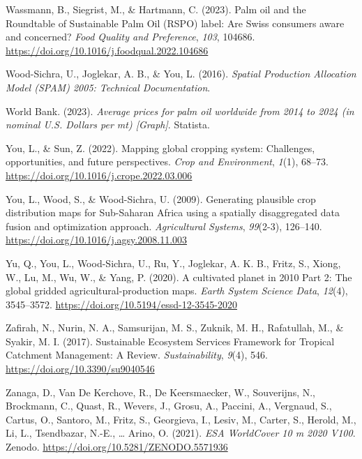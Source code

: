 \documentclass[
  letterpaper,
  DIV=11,
  numbers=noendperiod]{scrreprt}
\newlength{\cslhangindent}
\newlength{\cslentryspacingunit} %
\newenvironment{CSLReferences}[2] %
 {%
  \setlength{\parindent}{0pt}
  \ifodd #1
  \let\oldpar\par
  \def\par{\hangindent=\cslhangindent\oldpar}
  \fi
  \setlength{\parskip}{#2\cslentryspacingunit}
 }%
 {}
\begin{document}
\begin{CSLReferences}{1}{0}
\leavevmode{}%
Wassmann, B., Siegrist, M., \& Hartmann, C. (2023). Palm oil and the
{Roundtable} of {Sustainable Palm Oil} ({RSPO}) label: {Are Swiss}
consumers aware and concerned? \emph{Food Quality and Preference},
\emph{103}, 104686. \url{https://doi.org/10.1016/j.foodqual.2022.104686}

\leavevmode{}%
Wood-Sichra, U., Joglekar, A. B., \& You, L. (2016). \emph{Spatial
{Production Allocation Model} ({SPAM}) 2005: {Technical Documentation}}.

\leavevmode{}%
World Bank. (2023). \emph{Average prices for palm oil worldwide from
2014 to 2024 (in nominal {U}.{S}. Dollars per mt) {[}{Graph}{]}}.
{Statista}.

\leavevmode{}%
You, L., \& Sun, Z. (2022). Mapping global cropping system:
{Challenges}, opportunities, and future perspectives. \emph{Crop and
Environment}, \emph{1}(1), 68--73.
\url{https://doi.org/10.1016/j.crope.2022.03.006}

\leavevmode{}%
You, L., Wood, S., \& Wood-Sichra, U. (2009). Generating plausible crop
distribution maps for {Sub-Saharan Africa} using a spatially
disaggregated data fusion and optimization approach. \emph{Agricultural
Systems}, \emph{99}(2-3), 126--140.
\url{https://doi.org/10.1016/j.agsy.2008.11.003}

\leavevmode{}%
Yu, Q., You, L., Wood-Sichra, U., Ru, Y., Joglekar, A. K. B., Fritz, S.,
Xiong, W., Lu, M., Wu, W., \& Yang, P. (2020). A cultivated planet in
2010 \textendash{} {Part} 2: {The} global gridded
agricultural-production maps. \emph{Earth System Science Data},
\emph{12}(4), 3545--3572.
\url{https://doi.org/10.5194/essd-12-3545-2020}

\leavevmode{}%
Zafirah, N., Nurin, N. A., Samsurijan, M. S., Zuknik, M. H., Rafatullah,
M., \& Syakir, M. I. (2017). Sustainable {Ecosystem Services Framework}
for {Tropical Catchment Management}: {A Review}. \emph{Sustainability},
\emph{9}(4), 546. \url{https://doi.org/10.3390/su9040546}

\leavevmode{}%
Zanaga, D., Van De Kerchove, R., De Keersmaecker, W., Souverijns, N.,
Brockmann, C., Quast, R., Wevers, J., Grosu, A., Paccini, A., Vergnaud,
S., Cartus, O., Santoro, M., Fritz, S., Georgieva, I., Lesiv, M.,
Carter, S., Herold, M., Li, L., Tsendbazar, N.-E., \ldots{} Arino, O.
(2021). \emph{{ESA WorldCover} 10 m 2020 V100}. {Zenodo}.
\url{https://doi.org/10.5281/ZENODO.5571936}


\end{CSLReferences}
\end{document}
